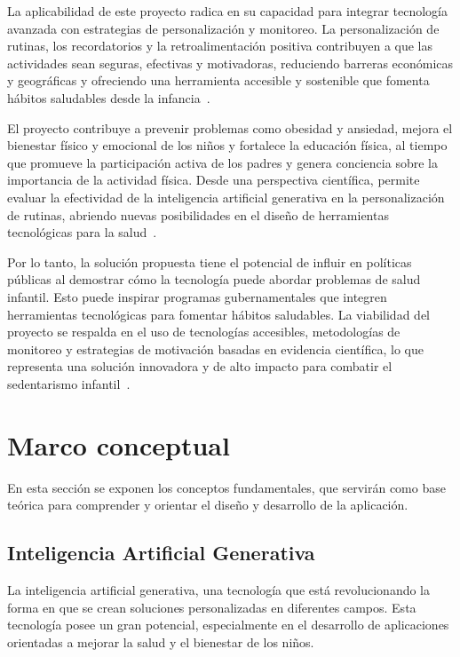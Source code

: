 			La aplicabilidad de este proyecto radica en su capacidad para integrar tecnología avanzada con estrategias de personalización y monitoreo. La personalización de rutinas, los recordatorios y la retroalimentación positiva contribuyen a que las actividades sean seguras, efectivas y motivadoras, reduciendo barreras económicas y geográficas y ofreciendo una herramienta accesible y sostenible que fomenta hábitos saludables desde la infancia~\cite{Zhu2024,Direito2017}.
			
			El proyecto contribuye a prevenir problemas como obesidad y ansiedad, mejora el bienestar físico y emocional de los niños y fortalece la educación física, al tiempo que promueve la participación activa de los padres y genera conciencia sobre la importancia de la actividad física. Desde una perspectiva científica, permite evaluar la efectividad de la inteligencia artificial generativa en la personalización de rutinas, abriendo nuevas posibilidades en el diseño de herramientas tecnológicas para la salud~\cite{Pareek2025}.
			
			Por lo tanto, la solución propuesta tiene el potencial de influir en políticas públicas al demostrar cómo la tecnología puede abordar problemas de salud infantil. Esto puede inspirar programas gubernamentales que integren herramientas tecnológicas para fomentar hábitos saludables. La viabilidad del proyecto se respalda en el uso de tecnologías accesibles, metodologías de monitoreo y estrategias de motivación basadas en evidencia científica, lo que representa una solución innovadora y de alto impacto para combatir el sedentarismo infantil~\cite{Guthold2020,Bull2020}.

	\label{marcoteorico}
	
		\section{Marco conceptual}
			En esta sección se exponen los conceptos fundamentales, que servirán como base teórica para comprender y orientar el diseño y desarrollo de la aplicación.
			
			\subsection{Inteligencia Artificial Generativa}
				La inteligencia artificial generativa, una tecnología que está revolucionando la forma en que se crean soluciones personalizadas en diferentes campos. Esta tecnología posee un gran potencial, especialmente en el desarrollo de aplicaciones orientadas a mejorar la salud y el bienestar de los niños.

